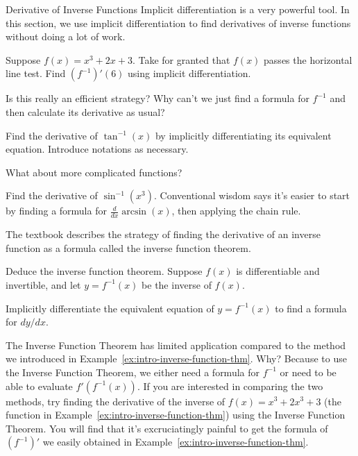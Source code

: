 \documentclass[../main.tex]{subfiles}
\begin{document}
\begin{lesson}{Derivative of Inverse Functions}
  Implicit differentiation is a very powerful tool. In this section, we use implicit differentiation to find derivatives of inverse functions without doing a lot of work. 

  \begin{example} \label{ex:intro-inverse-function-thm}
    Suppose \(f(x) = x^{3} + 2x + 3\). Take for granted that \(f(x)\) passes the horizontal line test. Find \((f^{-1})'(6)\) using implicit differentiation.
  \end{example}
  \faComment{} Is this really an efficient strategy? Why can't we just find a formula for \(f^{-1}\) and then calculate its derivative as usual?
  \clearpage

  \begin{example} \label{ex:derivative-of-arctan}
    Find the derivative of \(\tan^{-1}(x)\) by implicitly differentiating its equivalent equation.  
    Introduce notations as necessary.

  \end{example}
  
  What about more complicated functions? 
  \begin{example} \label{ex:derivative-of-arcsin}
    Find the derivative of \(\sin^{-1}(x^{3})\).  Conventional wisdom says it's easier to start by finding a formula for \(\frac{d}{dx} \arcsin(x)\), then applying the chain rule.

  \end{example}
  \clearpage

  The textbook describes the strategy of finding the derivative of an inverse function as a formula called the inverse function theorem. 
  \begin{example}
    Deduce the inverse function theorem.  Suppose \(f(x)\) is differentiable and invertible, and let \(y = f^{-1}(x)\) be the inverse of \(f(x)\).

    Implicitly differentiate the equivalent equation of \(y = f^{-1}(x)\) to find a formula for \(dy/dx\).

  \end{example}

  \faExclamationTriangle{} The Inverse Function Theorem has limited application compared to the method we introduced in Example~\ref{ex:intro-inverse-function-thm}. Why? Because to use the Inverse Function Theorem, we either need a formula for \(f^{-1}\) or need to be able to evaluate \(f'(f^{-1}(x))\). If you are interested in comparing the two methods, try finding the derivative of the inverse of \(f(x) = x^{3} + 2x^{3} + 3\) (the function in Example~\ref{ex:intro-inverse-function-thm}) using the Inverse Function Theorem. You will find that it's excruciatingly painful to get the formula of \((f^{-1})'\) we easily obtained in Example~\ref{ex:intro-inverse-function-thm}.

  
\end{lesson}
\end{document}
